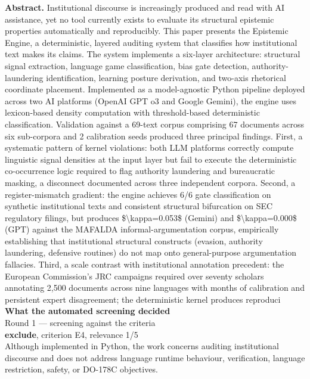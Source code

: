 \documentclass[11pt,a4paper]{article}
\begin{document}
{\small\textbf{Abstract.} Institutional discourse is increasingly produced and read with AI assistance, yet no tool currently exists to evaluate its structural epistemic properties automatically and reproducibly. This paper presents the Epistemic Engine, a deterministic, layered auditing system that classifies how institutional text makes its claims. The system implements a six-layer architecture: structural signal extraction, language game classification, bias gate detection, authority-laundering identification, learning posture derivation, and two-axis rhetorical coordinate placement. Implemented as a model-agnostic Python pipeline deployed across two AI platforms (OpenAI GPT o3 and Google Gemini), the engine uses lexicon-based density computation with threshold-based deterministic classification. Validation against a 69-text corpus comprising 67 documents across six sub-corpora and 2 calibration seeds produced three principal findings. First, a systematic pattern of kernel violations: both LLM platforms correctly compute linguistic signal densities at the input layer but fail to execute the deterministic co-occurrence logic required to flag authority laundering and bureaucratic masking, a disconnect documented across three independent corpora. Second, a register-mismatch gradient: the engine achieves 6/6 gate classification on synthetic institutional texts and consistent structural bifurcation on SEC regulatory filings, but produces \$\textbackslash{}kappa=0.053\$ (Gemini) and \$\textbackslash{}kappa=0.000\$ (GPT) against the MAFALDA informal-argumentation corpus, empirically establishing that institutional structural constructs (evasion, authority laundering, defensive routines) do not map onto general-purpose argumentation fallacies. Third, a scale contrast with institutional annotation precedent: the European Commission's JRC campaigns required over seventy scholars annotating 2,500 documents across nine languages with months of calibration and persistent expert disagreement; the deterministic kernel produces reproduci}
\vspace{3mm}
\vspace{2.5mm}
{\small\textbf{What the automated screening decided}}\\[2mm]
{\footnotesize\color{soft}Round 1 --- screening against the criteria}\\[0.5mm]
{\small\textbf{exclude}, criterion E4, relevance 1/5}\\[0.5mm]
{\small Although implemented in Python, the work concerns auditing institutional discourse and does not address language runtime behaviour, verification, language restriction, safety, or DO-178C objectives.}\\[2.5mm]
\end{document}
